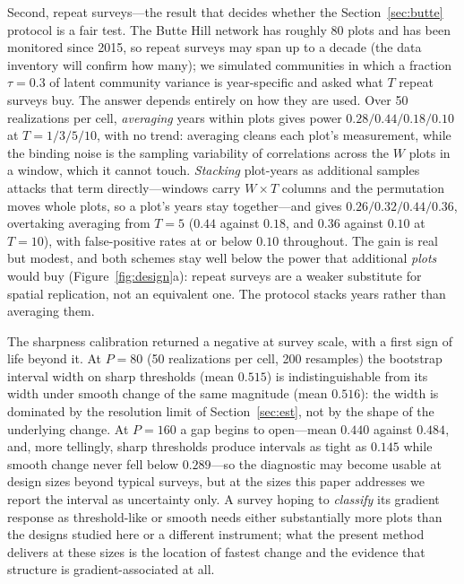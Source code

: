 \documentclass[review,12pt,authoryear]{elsarticle}
\theoremstyle{remark}
\begin{document}
Second, repeat surveys---the result that decides whether the
Section~\ref{sec:butte} protocol is a fair test. The Butte Hill network has
roughly 80 plots and has been monitored since 2015, so repeat surveys may
span up to a decade (the data inventory will confirm how many); we simulated communities
in which a fraction $\tau = 0.3$ of latent community variance is
year-specific and asked what $T$ repeat surveys buy. The answer depends
entirely on how they are used. Over 50 realizations per cell,
\emph{averaging} years within plots gives power $0.28/0.44/0.18/0.10$ at
$T = 1/3/5/10$, with no trend: averaging cleans each plot's measurement,
while the binding noise is the sampling variability of correlations across
the $W$ plots in a window, which it cannot touch. \emph{Stacking}
plot-years as additional samples attacks that term directly---windows carry
$W \times T$ columns and the permutation moves whole plots, so a plot's
years stay together---and gives $0.26/0.32/0.44/0.36$, overtaking averaging
from $T = 5$ ($0.44$ against $0.18$, and $0.36$ against $0.10$ at
$T = 10$), with false-positive rates at or below $0.10$ throughout. The
gain is real but modest, and both schemes stay well below the power that
additional \emph{plots} would buy (Figure~\ref{fig:design}a): repeat
surveys are a weaker substitute for spatial replication, not an equivalent
one. The protocol stacks years rather than averaging them.

The sharpness calibration returned a negative at survey scale, with a first
sign of life beyond it. At $P = 80$ (50 realizations per cell, 200
resamples) the bootstrap interval width on sharp thresholds (mean $0.515$)
is indistinguishable from its width under smooth change of the same
magnitude (mean $0.516$): the width is dominated by the resolution limit of
Section~\ref{sec:est}, not by the shape of the underlying change. At
$P = 160$ a gap begins to open---mean $0.440$ against $0.484$, and, more
tellingly, sharp thresholds produce intervals as tight as $0.145$ while
smooth change never fell below $0.289$---so the diagnostic may become
usable at design sizes beyond typical surveys, but at the sizes this paper
addresses we report the interval as uncertainty only. A survey
hoping to \emph{classify} its gradient response as threshold-like or smooth
needs either substantially more plots than the designs studied here or a
different instrument; what the present method delivers at these sizes is the
location of fastest change and the evidence that structure is
gradient-associated at all.
\end{document}
